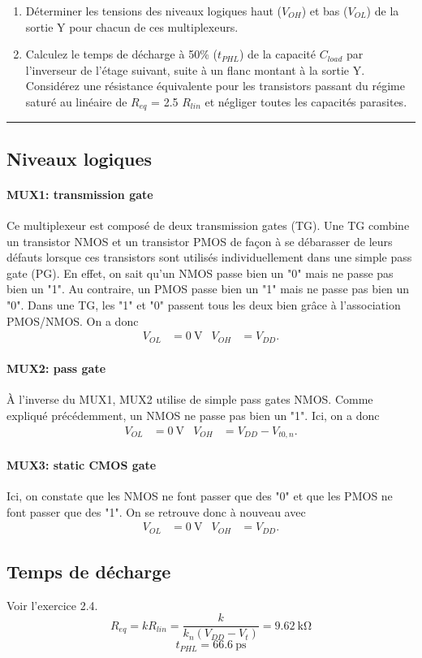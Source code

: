 \documentclass[frenchb,DIV=14]{scrartcl}
\begin{document}
\begin{enumerate}
	\item Déterminer les tensions des niveaux logiques haut ($V_{OH}$) et bas ($V_{OL}$) de
	la sortie Y pour chacun de ces multiplexeurs.
	\item Calculez le temps de décharge à 50\% ($t_{PHL}$) de la capacité $C_{load}$ par
	l'inverseur de l'étage suivant, suite à un flanc montant à la sortie Y. Considérez une
	résistance équivalente pour les transistors passant du régime saturé au linéaire de
	$R_{eq}$ = 2.5 $R_{lin}$ et négliger toutes les capacités parasites.
\end{enumerate}

\hspace{1cm}\hrule

\subsection*{Niveaux logiques}
\paragraph{MUX1: transmission gate} 
Ce multiplexeur est composé de deux transmission gates (TG).
Une TG combine un transistor NMOS et un transistor PMOS de façon à se débarasser
de leurs défauts lorsque ces transistors sont utilisés individuellement dans une
simple pass gate (PG). En effet, on sait qu'un NMOS passe bien un "0" mais ne passe
pas bien un "1". Au contraire, un PMOS passe bien un "1" mais ne passe pas bien un "0".
Dans une TG, les "1" et "0" passent tous les deux bien grâce à l'association PMOS/NMOS.
On a donc
\begin{align*}
	V_{OL} &= \SI{0}{\volt} & V_{OH} &= V_{DD}.
\end{align*}

\paragraph{MUX2: pass gate} 
\`{A} l'inverse du MUX1, MUX2 utilise de simple pass gates NMOS.
Comme expliqué précédemment, un NMOS ne passe pas bien un "1". Ici, on a donc
\begin{align*}
	V_{OL} &= \SI{0}{\volt} & V_{OH} &= V_{DD}-V_{t0,n}.
\end{align*}

\paragraph{MUX3: static CMOS gate}
Ici, on constate que les NMOS ne font passer que des "0" et que les PMOS ne
font passer que des "1". On se retrouve donc à nouveau avec
\begin{align*}
	V_{OL} &= \SI{0}{\volt} & V_{OH} &= V_{DD}.
\end{align*}

\subsection*{Temps de décharge}
Voir l'exercice 2.4.
\[R_{eq} = k R_{lin} = \frac{k}{k_n (V_{DD} - V_t)} = \SI{9.62}{\kilo\ohm} \]
\[t_{PHL} = \SI{66.6}{\pico\second} \]
\end{document}
